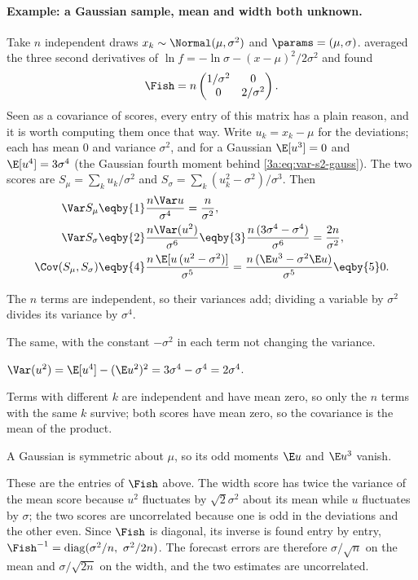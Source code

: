 \paragraph{Example: a Gaussian sample, mean and width both unknown.} Take $n$ independent draws
$x_k\sim\Normal(\mu,\sigma^2)$ and $\params=(\mu,\sigma)$.  averaged the three second
derivatives of $\ln f=-\ln\sigma-(x-\mu)^2/2\sigma^2$ and found 
\[
  \Fish=n\begin{pmatrix}1/\sigma^2&0\\0&2/\sigma^2\end{pmatrix}.
\]
Seen as a covariance of scores, every entry of this matrix has a plain reason, and it is worth computing
them once that way. Write $u_k=x_k-\mu$ for the deviations; each has mean $0$ and variance $\sigma^2$, and for a
Gaussian $\E[u^3]=0$ and $\E[u^4]=3\sigma^4$ (the Gaussian fourth moment behind \eqref{3a:eq:var-s2-gauss}). The two scores are
$S_\mu=\sum_ku_k/\sigma^2$ and $S_\sigma=\sum_k(u_k^2-\sigma^2)/\sigma^3$. Then
\begin{align}
  \Var S_\mu&\eqby{1}\frac{n\Var u}{\sigma^4}=\frac n{\sigma^2},
  \nonumber\\
  \Var S_\sigma&\eqby{2}\frac{n\Var(u^2)}{\sigma^6}\eqby{3}\frac{n\,(3\sigma^4-\sigma^4)}{\sigma^6}=\frac{2n}{\sigma^2},
  \nonumber\\
  \Cov(S_\mu,S_\sigma)&\eqby{4}\frac{n\,\E[u\,(u^2-\sigma^2)]}{\sigma^5}=\frac{n\,(\E u^3-\sigma^2\E u)}{\sigma^5}\eqby{5}0.
  \nonumber
\end{align}
\begin{explain}
  \item The $n$ terms are independent, so their variances add; dividing a variable by $\sigma^2$ divides its
        variance by $\sigma^4$.
  \item The same, with the constant $-\sigma^2$ in each term not changing the variance.
  \item $\Var(u^2)=\E[u^4]-(\E u^2)^2=3\sigma^4-\sigma^4=2\sigma^4$.
  \item Terms with different $k$ are independent and have mean zero, so only the $n$ terms with the same
        $k$ survive; both scores have mean zero, so the covariance is the mean of the product.
  \item A Gaussian is symmetric about $\mu$, so its odd moments $\E u$ and $\E u^3$ vanish.
\end{explain}
These are the entries of $\Fish$ above. The width score has twice the variance of the mean score because
$u^2$ fluctuates by $\sqrt2\sigma^2$ about its mean while $u$ fluctuates by $\sigma$; the two scores are
uncorrelated because one is odd in the deviations and the other even. Since $\Fish$ is diagonal, its inverse is
found entry by entry, $\Fish^{-1}=\mathrm{diag}(\sigma^2/n,\ \sigma^2/2n)$. The forecast errors are therefore
$\sigma/\sqrt n$ on the mean and $\sigma/\sqrt{2n}$ on the width, and the two estimates are uncorrelated.


